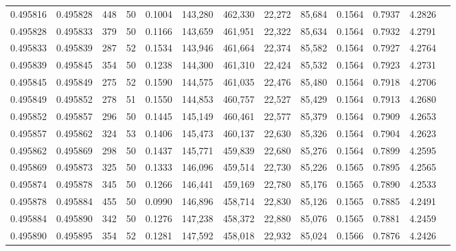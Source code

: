 \begin{tabular}{rrrrrrrrrrrrr}
0.495816 & 0.495828 & 448 &  50 &                                     0.1004 & 143,280 & 462,330 &  22,272 &  85,684 & 0.1564 & 0.7937 & 4.2826 \\
0.495828 & 0.495833 & 379 &  50 &                                     0.1166 & 143,659 & 461,951 &  22,322 &  85,634 & 0.1564 & 0.7932 & 4.2791 \\
0.495833 & 0.495839 & 287 &  52 &                                     0.1534 & 143,946 & 461,664 &  22,374 &  85,582 & 0.1564 & 0.7927 & 4.2764 \\
0.495839 & 0.495845 & 354 &  50 &                                     0.1238 & 144,300 & 461,310 &  22,424 &  85,532 & 0.1564 & 0.7923 & 4.2731 \\
0.495845 & 0.495849 & 275 &  52 &                                     0.1590 & 144,575 & 461,035 &  22,476 &  85,480 & 0.1564 & 0.7918 & 4.2706 \\
0.495849 & 0.495852 & 278 &  51 &                                     0.1550 & 144,853 & 460,757 &  22,527 &  85,429 & 0.1564 & 0.7913 & 4.2680 \\
0.495852 & 0.495857 & 296 &  50 &                                     0.1445 & 145,149 & 460,461 &  22,577 &  85,379 & 0.1564 & 0.7909 & 4.2653 \\
0.495857 & 0.495862 & 324 &  53 &                                     0.1406 & 145,473 & 460,137 &  22,630 &  85,326 & 0.1564 & 0.7904 & 4.2623 \\
0.495862 & 0.495869 & 298 &  50 &                                     0.1437 & 145,771 & 459,839 &  22,680 &  85,276 & 0.1564 & 0.7899 & 4.2595 \\
0.495869 & 0.495873 & 325 &  50 &                                     0.1333 & 146,096 & 459,514 &  22,730 &  85,226 & 0.1565 & 0.7895 & 4.2565 \\
0.495874 & 0.495878 & 345 &  50 &                                     0.1266 & 146,441 & 459,169 &  22,780 &  85,176 & 0.1565 & 0.7890 & 4.2533 \\
0.495878 & 0.495884 & 455 &  50 &                                     0.0990 & 146,896 & 458,714 &  22,830 &  85,126 & 0.1565 & 0.7885 & 4.2491 \\
0.495884 & 0.495890 & 342 &  50 &                                     0.1276 & 147,238 & 458,372 &  22,880 &  85,076 & 0.1565 & 0.7881 & 4.2459 \\
0.495890 & 0.495895 & 354 &  52 &                                     0.1281 & 147,592 & 458,018 &  22,932 &  85,024 & 0.1566 & 0.7876 & 4.2426 \\

\end{tabular}
